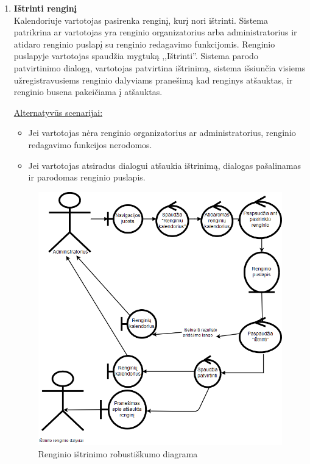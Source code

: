 \documentclass{VUMIFPSkursinis}
\begin{document}
\begin{enumerate} [label = \textbf{U\arabic*.}]
			\item \textbf{Ištrinti renginį}   \\
					Kalendoriuje vartotojas pasirenka renginį, kurį nori ištrinti. Sistema patrikrina ar vartotojas yra renginio organizatorius arba administratorius ir atidaro renginio puslapį su renginio redagavimo funkcijomis. Renginio puslapyje vartotojas spaudžia mygtuką ,,Ištrinti''. Sistema parodo patvirtinimo dialogą, vartotojas patvirtina ištrinimą, sistema išsiunčia visiems užregistravusiems renginio dalyviams pranešimą kad renginys atšauktas, ir renginio busena pakeičiama į atšauktas.
					
					\underline{Alternatyvūs scenarijai:}
					\begin{itemize}
						\item Jei vartotojas nėra renginio organizatorius ar administratorius, renginio redagavimo funkcijos nerodomos.
						\item Jei vartotojas atsiradus dialogui atšaukia ištrinimą, dialogas pašalinamas ir parodomas renginio puslapis.
					\end{itemize}
					
					\begin{figure}[H]
						\centering
						\includegraphics[width=\textwidth]{img/PSI5/u24.png}
						\caption{Renginio ištrinimo robustiškumo diagrama}
						\label{draw:u24}
					\end{figure}
				

\end{enumerate}
\end{document}
